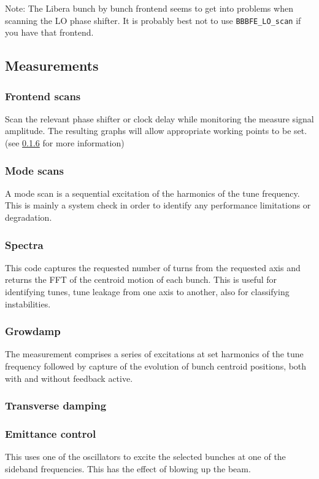 \documentclass{report}
\begin{document}
Note: The Libera bunch by bunch frontend seems to get into problems when scanning the LO phase shifter. It is probably best not to use \verb|BBBFE_LO_scan| if you have that frontend.

\subsection{Measurements}
\subsubsection{Frontend scans}
Scan the relevant phase shifter or clock delay while monitoring the measure signal amplitude. The resulting graphs will allow appropriate working points to be set. (see \ref{} for more information)

\subsubsection{Mode scans}
A mode scan is a sequential excitation of the harmonics of the tune frequency. This is mainly a system check in order to identify any performance limitations or degradation.

\subsubsection{Spectra}
This code captures the requested number of turns from the requested axis and returns the FFT of the centroid motion of each bunch. This is useful for identifying tunes, tune leakage from one axis to another, also for classifying instabilities.

\subsubsection{Growdamp}
The measurement comprises a series of excitations at set harmonics of the tune frequency followed by capture of the evolution of bunch centroid positions, both with and without feedback active.

\subsubsection{Transverse damping}

\subsubsection{Emittance control}
This uses one of the oscillators to excite the selected bunches at one of the sideband frequencies. This has the effect of blowing up the beam.
\end{document}
